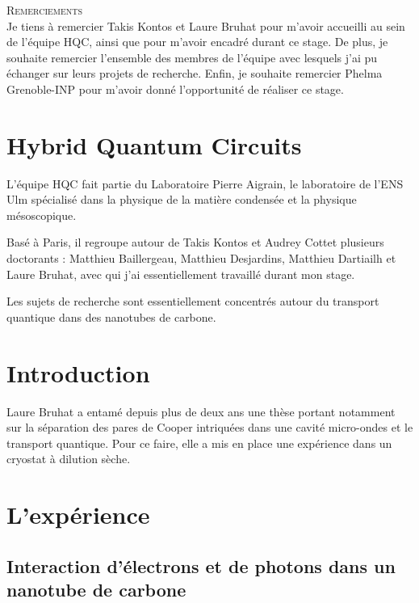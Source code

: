 \documentclass[a4paper,11pt]{report}
\date{}
\title{}
\author{}
\begin{document}
\nocite{*}


\begin{center}
\textsc{\Large Remerciements}
\\
\vspace{0.5cm}
Je tiens à remercier Takis Kontos et Laure Bruhat pour m'avoir accueilli au sein de l'équipe HQC, ainsi que pour m'avoir encadré durant ce stage. De plus, je souhaite remercier l'ensemble des membres de l'équipe avec lesquels j'ai pu échanger sur leurs projets de recherche. Enfin, je souhaite remercier Phelma Grenoble-INP pour m'avoir donné l'opportunité de réaliser ce stage.
\end{center}

\chapter*{Hybrid Quantum Circuits}
L'équipe HQC fait partie du Laboratoire Pierre Aigrain, le laboratoire de l'ENS Ulm spécialisé dans la physique de la matière condensée et la physique mésoscopique.

Basé à Paris, il regroupe autour de Takis Kontos et Audrey Cottet plusieurs doctorants : Matthieu Baillergeau, Matthieu Desjardins, Matthieu Dartiailh et Laure Bruhat, avec qui j'ai essentiellement travaillé durant mon stage.

Les sujets de recherche sont essentiellement concentrés autour du transport quantique dans des nanotubes de carbone.

\chapter*{Introduction} %

Laure Bruhat a entamé depuis plus de deux ans une thèse portant notamment sur la séparation des pares de Cooper intriquées dans une cavité micro-ondes et le transport quantique. Pour ce faire, elle a mis en place une expérience dans un cryostat à dilution sèche.


\chapter{L'expérience}

\section{Interaction d'électrons et de photons dans un nanotube de carbone}
\end{document}
